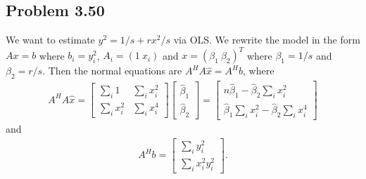 \documentclass[letterpaper,12pt]{article}
\theoremstyle{definition}
\begin{document}
\begin{spacing}{1.3}{}
\begin{enumerate}
\end{enumerate}


\subsection*{Problem 3.50}
	We want to estimate $y^2=1/s+rx^2/s$ via OLS.
	We rewrite the model in the form $Ax=b$ where
	$b_i=y_i^2$, $A_i=(1\ x_i)$ and $x=(\beta_1\ \beta_2)^T$ where $\beta_1=1/s$ and $\beta_2=r/s$.
	Then the normal equations are $A^HA\hat{x}=A^Hb$, where
	\begin{align*}
	A^HA\hat{x} =
	\begin{bmatrix}
	\sum_i 1 & \sum_ix_i^2\\
	\sum_ix_i^2& \sum_ix_i^4
	\end{bmatrix}
	\begin{bmatrix}
	\hat{\beta}_1\\ \hat{\beta}_2
	\end{bmatrix} =
	\begin{bmatrix}
	n\hat{\beta}_1 - \hat{\beta}_2\sum_i x_i^2\\
	\hat{\beta}_1\sum_ix_i^2 - \hat{\beta}_2\sum_ix_i^4
	\end{bmatrix}
	\end{align*}
	and
	\begin{align*}
	A^Hb=
	\begin{bmatrix}
	\sum_i y_i^2\\
	\sum_i x_i^2y_i^2
	\end{bmatrix}.
	\end{align*}


 \end{spacing}
\end{document}
